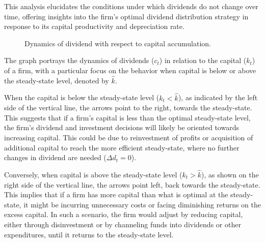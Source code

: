 \documentclass[12pt]{article}
\begin{document}
This analysis elucidates the conditions under which dividends do not change over time, offering insights into the firm's
optimal dividend  distribution strategy in response to its capital productivity and depreciation rate.
\begin{figure}
    \centering
    \caption{Dynamics of dividend with respect to capital accumulation.}
    \label{fig:dividend_dynamics}
\end{figure}

The graph portrays the dynamics of dividends (\(c_t\)) in relation to the capital (\(k_t\)) of a firm, with a
particular focus on the behavior when capital is below or above the steady-state level,  denoted by \(\hat{k}\).

When the capital is below the steady-state level (\(k_t < \hat{k}\)), as indicated by the left side of the vertical
line, the arrows point to the right, towards the steady-state. This suggests that if a firm's capital is less than the
optimal steady-state level, the firm's dividend and investment decisions will likely be oriented towards increasing
capital. This could be  due to reinvestment of profits or acquisition of additional capital to reach the more efficient
steady-state, where no further changes in dividend are needed (\(\Delta d_t = 0\)).

Conversely, when capital is above the steady-state level (\(k_t > \hat{k}\)), as shown on  the right side of the
vertical line, the  arrows point left, back towards the steady-state. This implies that if a firm has more capital than
what is optimal at the steady-state, it might be incurring unnecessary costs or facing diminishing returns on the excess
capital. In such a scenario, the firm would adjust by reducing capital, either through disinvestment or by channeling
funds into dividends or other expenditures, until it returns to the steady-state level.
 
\end{document}
